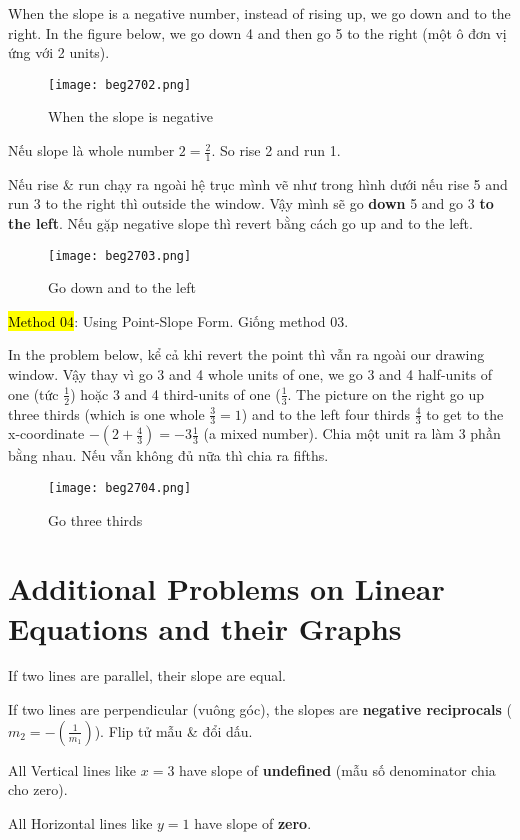 When the slope is a negative number, instead of rising up, we go down and to the right. In the figure below, we go down 4 and then go 5 to the right (một ô đơn vị ứng với 2 units).

\begin{figure}[htb!]
  \centering
  \texttt{[image: beg2702.png]}
  \caption{When the slope is negative}
\end{figure}

\vspace{0.5cm}

Nếu slope là whole number $2=\frac{2}{1}$. So rise 2 and run 1.


Nếu rise \& run chạy ra ngoài hệ trục mình vẽ như trong hình dưới nếu rise 5 and run 3 to the right thì outside the window. Vậy mình sẽ go \textbf{down} 5 and go 3 \textbf{to the left}. Nếu gặp negative slope thì revert bằng cách go up and to the left.

\begin{figure}[htb!]
  \centering
  \texttt{[image: beg2703.png]}
  \caption{Go down and to the left}
\end{figure}

\hl{Method 04}: Using Point-Slope Form. Giống method 03.

\vspace{8mm}

In the problem below, kể cả khi revert the point thì vẫn ra ngoài our drawing window. Vậy thay vì go 3 and 4 whole units of one, we go 3 and 4 half-units of one (tức $\frac{1}{2}$) hoặc 3 and 4 third-units of one ($\frac{1}{3}$. The picture on the right go up three thirds (which is one whole $\frac{3}{3}=1$) and to the left four thirds $\frac{4}{3}$ to get to the x-coordinate $-(2+\frac{4}{3})=-3\frac{1}{3}$ (a mixed number). Chia một unit ra làm 3 phần bằng nhau. Nếu vẫn không đủ nữa thì chia ra fifths.

\begin{figure}[htb!]
  \centering
  \texttt{[image: beg2704.png]}
  \caption{Go three thirds}
\end{figure}

\section{Additional Problems on Linear Equations and their Graphs}

If two lines are parallel, their slope are equal.

If two lines are perpendicular (vuông góc), the slopes are \textbf{negative reciprocals} ($m_{2}=-(\frac{1}{m_{1}})$). Flip tử mẫu \& đổi dấu.


\vspace{.4cm}

All Vertical lines like $x=3$ have slope of \textbf{undefined} (mẫu số denominator chia cho zero).

All Horizontal lines like $y=1$ have slope of \textbf{zero}.
